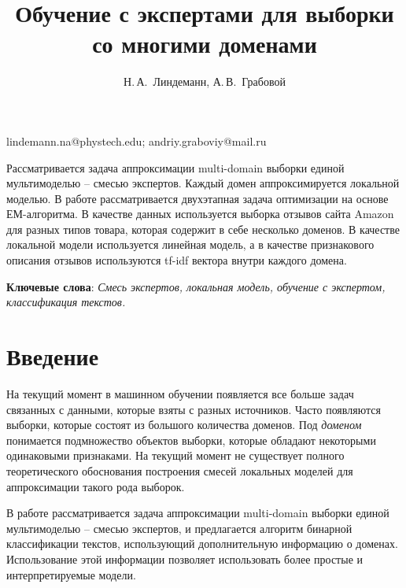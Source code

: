 \documentclass[12pt, twoside]{article}
\begin{document}
\title
    {Обучение с экспертами для выборки со многими доменами} %
\author
    {Н.\,А.~Линдеманн, А.\,В.~Грабовой} %
\email
    {lindemann.na@phystech.edu; andriy.graboviy@mail.ru}
\abstract
    {Рассматривается задача аппроксимации multi-domain выборки единой мультимоделью -- смесью экспертов. Каждый домен аппроксимируется локальной моделью. В работе рассматривается двухэтапная задача оптимизации на основе ЕМ-алгоритма. В качестве данных используется выборка отзывов сайта Amazon для разных типов товара, которая содержит в себе несколько доменов. В качестве локальной модели используется линейная модель, а в качестве признакового описания отзывов используются tf-idf вектора внутри каждого домена.

	
\bigskip
\noindent
\textbf{Ключевые слова}: \emph {Смесь экспертов, локальная модель, обучение с экспертом, классификация текстов.}

}


\maketitle
\linenumbers

\section{Введение}
На текущий момент в машинном обучении появляется все больше задач связанных с данными, которые взяты с разных источников. Часто появляются выборки, которые состоят из большого количества доменов. Под \textit{доменом} понимается подмножество объектов выборки, которые обладают некоторыми одинаковыми признаками. На текущий момент не существует полного теоретического обоснования построения смесей локальных моделей для аппроксимации такого рода выборок. 

В работе рассматривается задача аппроксимации multi-domain выборки единой мультимоделью -- смесью экспертов, и предлагается алгоритм бинарной классификации текстов, использующий дополнительную информацию о доменах. Использование этой информации позволяет использовать более простые и интерпретируемые модели.
\end{document}
